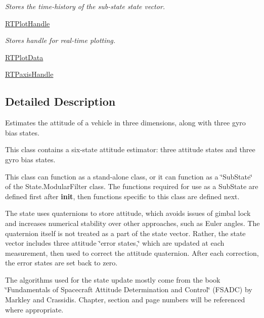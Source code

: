 \begin{DoxyCompactItemize}
\begin{DoxyCompactList}\small\item\em Stores the time-\/history of the sub-\/state state vector. \end{DoxyCompactList}\item 
\hyperlink{classmodest_1_1substates_1_1substate_1_1SubState_a37ded775b84cea85b4dce0f1b16286c4}{R\+T\+Plot\+Handle}
\begin{DoxyCompactList}\small\item\em Stores handle for real-\/time plotting. \end{DoxyCompactList}\item 
\hyperlink{classmodest_1_1substates_1_1substate_1_1SubState_a9fefae1facc797a1132fb61a55e9ffa1}{R\+T\+Plot\+Data}
\item 
\hyperlink{classmodest_1_1substates_1_1substate_1_1SubState_a497ccbb6658589b02568e87c6382222e}{R\+T\+Paxis\+Handle}
\end{DoxyCompactItemize}


\subsection{Detailed Description}
Estimates the attitude of a vehicle in three dimensions, along with three gyro bias states. 

This class contains a six-\/state attitude estimator\+: three attitude states and three gyro bias states.

This class can function as a stand-\/alone class, or it can function as a \char`\"{}\+Sub\+State\char`\"{} of the State.\+Modular\+Filter class. The functions required for use as a Sub\+State are defined first after {\bfseries init}, then functions specific to this class are defined next.

The state uses quaternions to store attitude, which avoids issues of gimbal lock and increases numerical stability over other approaches, such as Euler angles. The quaternion itself is not treated as a part of the state vector. Rather, the state vector includes three attitude \char`\"{}error states,\char`\"{} which are updated at each measurement, then used to correct the attitude quaternion. After each correction, the error states are set back to zero.

The algorithms used for the state update mostly come from the book \char`\"{}\+Fundamentals of Spacecraft Attitude Determination and Control\char`\"{} (F\+S\+A\+DC) by Markley and Crassidis. Chapter, section and page numbers will be referenced where appropriate. 

